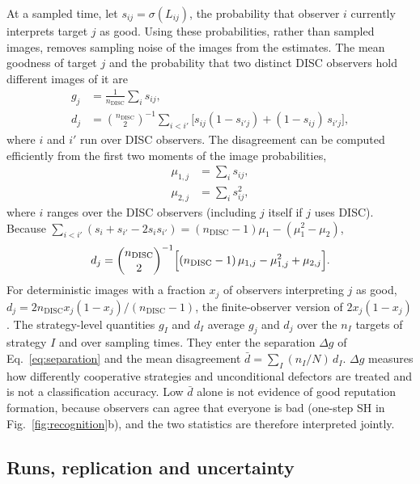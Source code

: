 \documentclass[10pt]{wlscirep}
\newcommand{\DISC}{\mathrm{DISC}}
\theoremstyle{plain}
\theoremstyle{remark}
\begin{document}
At a sampled time, let $s_{ij}=\sigma(L_{ij})$, the probability that observer $i$ currently interprets target $j$ as good. Using these probabilities, rather than sampled images, removes sampling noise of the images from the estimates. The mean goodness of target $j$ and the probability that two distinct DISC observers hold different images of it are
\begin{equation}
\begin{aligned}
g_j&=\frac{1}{n_{\DISC}}\sum_is_{ij},\\
d_j&=\binom{n_{\DISC}}{2}^{-1}\sum_{i<i'}\bigl[s_{ij}(1-s_{i'j})+(1-s_{ij})\,s_{i'j}\bigr],
\end{aligned}
\label{eq:s-goodness}
\end{equation}
where $i$ and $i'$ run over DISC observers. The disagreement can be computed efficiently from the first two moments of the image probabilities,
\begin{equation}
\begin{aligned}
\mu_{1,j}&=\sum_is_{ij},\\
\mu_{2,j}&=\sum_is_{ij}^2,
\end{aligned}
\label{eq:s-moments}
\end{equation}
where $i$ ranges over the DISC observers (including $j$ itself if $j$ uses DISC). Because $\sum_{i<i'}(s_i+s_{i'}-2s_is_{i'})=(n_{\DISC}-1)\mu_1-(\mu_1^2-\mu_2)$,
\begin{equation}
d_j=\binom{n_{\DISC}}{2}^{-1}\Bigl[(n_{\DISC}-1)\,\mu_{1,j}-\mu_{1,j}^2+\mu_{2,j}\Bigr].
\label{eq:s-estimators}
\end{equation}
For deterministic images with a fraction $x_j$ of observers interpreting $j$ as good, $d_j=2n_{\DISC}x_j(1-x_j)/(n_{\DISC}-1)$, the finite-observer version of $2x_j(1-x_j)$. The strategy-level quantities $g_I$ and $d_I$ average $g_j$ and $d_j$ over the $n_I$ targets of strategy $I$ and over sampling times. They enter the separation $\Delta g$ of Eq.~\eqref{eq:separation} and the mean disagreement $\bar d=\sum_I(n_I/N)\,d_I$. $\Delta g$ measures how differently cooperative strategies and unconditional defectors are treated and is not a classification accuracy. Low $\bar d$ alone is not evidence of good reputation formation, because observers can agree that everyone is bad (one-step SH in Fig.~\ref{fig:recognition}b), and the two statistics are therefore interpreted jointly.

\subsection{Runs, replication and uncertainty}
\end{document}
